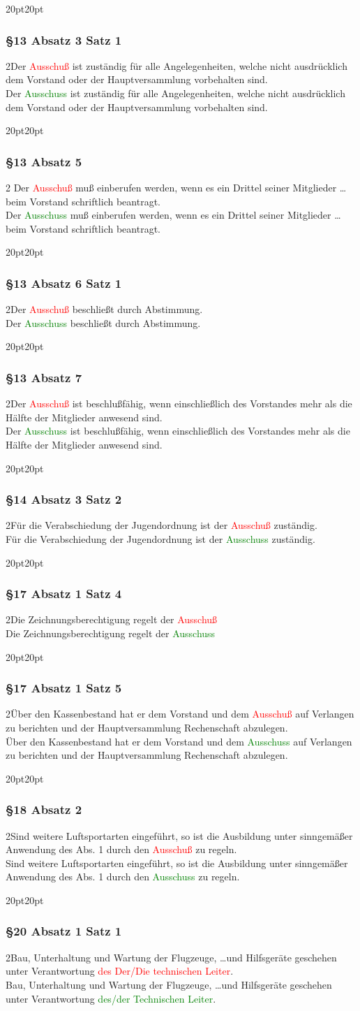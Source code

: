 \documentclass[10pt,a4paper,parskip=half]{scrartcl}
\newcommand{\new}[1]{\textcolor{Green}{#1}}
\newcommand{\old}[1]{\textcolor{Red}{#1}}
\newcommand{\change}[1]{
  \begin{adjustwidth}{20pt}{20pt}
    #1
  \end{adjustwidth}
}
\newcommand{\compare}[3]{\change{\subsubsection*{#1}\begin{multicols}{2}#2\columnbreak\\#3\end{multicols}}}
\begin{document}
  \compare{§13 Absatz 3 Satz 1}
  {Der \old{Ausschuß} ist zuständig für alle Angelegenheiten, welche nicht ausdrücklich dem Vorstand oder der Hauptversammlung vorbehalten sind.}
  {Der \new{Ausschuss} ist zuständig für alle Angelegenheiten, welche nicht ausdrücklich dem Vorstand oder der Hauptversammlung vorbehalten sind.}

  \compare{§13 Absatz 5}{    
  Der \old{Ausschuß} muß einberufen werden,
    wenn es ein Drittel seiner Mitglieder \dots beim Vorstand schriftlich beantragt.
  }
  {Der \new{Ausschuss} muß einberufen werden,
  wenn es ein Drittel seiner Mitglieder \dots beim Vorstand schriftlich beantragt.}
  \compare{§13 Absatz 6 Satz 1}
  {Der \old{Ausschuß} beschließt durch Abstimmung.}
  {Der \new{Ausschuss} beschließt durch Abstimmung.}

  \compare{§13 Absatz 7}
  {Der \old{Ausschuß} ist beschlußfähig, wenn einschließlich des Vorstandes mehr als die Hälfte der Mitglieder anwesend sind.}
  {Der \new{Ausschuss} ist beschlußfähig, wenn einschließlich des Vorstandes mehr als die Hälfte der Mitglieder anwesend sind.}

  \compare{§14 Absatz 3 Satz 2}
  {Für die Verabschiedung der Jugendordnung ist der \old{Ausschuß} zuständig.}
  {Für die Verabschiedung der Jugendordnung ist der \new{Ausschuss} zuständig.}
    
  \compare{§17 Absatz 1 Satz 4}{Die Zeichnungsberechtigung regelt der \old{Ausschuß}}{Die Zeichnungsberechtigung regelt der \new{Ausschuss}}
  \compare{§17 Absatz 1 Satz 5}{Über den Kassenbestand hat er dem Vorstand und dem \old{Ausschuß} auf Verlangen zu berichten und der Hauptversammlung Rechenschaft abzulegen.}{Über den Kassenbestand hat er dem Vorstand und dem \new{Ausschuss} auf Verlangen zu berichten und der Hauptversammlung Rechenschaft abzulegen.}

  \compare{§18 Absatz 2}{Sind weitere Luftsportarten eingeführt, so ist die Ausbildung unter sinngemäßer Anwendung des
  Abs. 1 durch den \old{Ausschuß} zu regeln.}{Sind weitere Luftsportarten eingeführt, so ist die Ausbildung unter sinngemäßer Anwendung des
  Abs. 1 durch den \new{Ausschuss} zu regeln.}

  \compare{§20 Absatz 1 Satz 1}
  {Bau, Unterhaltung und Wartung der Flugzeuge, \dots und Hilfsgeräte geschehen unter Verantwortung \old{des Der/Die technischen Leiter}.}
  {Bau, Unterhaltung und Wartung der Flugzeuge, \dots und Hilfsgeräte geschehen unter Verantwortung \new{des/der Technischen Leiter}.}
  

\end{document}
